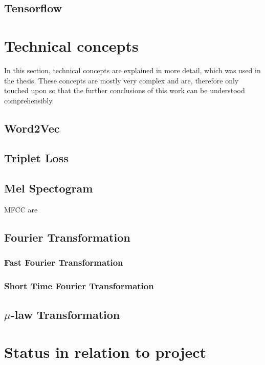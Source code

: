 \subsection{Tensorflow}
\label{sub:Tensorflow}

\section{Technical concepts}
\label{sec:Technical-Concepts}

In this section, technical concepts are explained in more detail, which was used in the thesis. These concepts are mostly very complex and are, therefore only touched upon so that the further conclusions of this work can be understood comprehensibly.

\subsection{Word2Vec}
\label{sub:word2wec}

\subsection{Triplet Loss}
\label{sub:Triplet-Loss}

\subsection{Mel Spectogram}
\label{sub:Mel-Spectogram}

\gls{MFCC} are

\subsection{Fourier Transformation}
\label{sub:Fourier-Transformation}

\subsubsection{Fast Fourier Transformation}
\label{subsub:Fast-Fourier-Transformation}

\subsubsection{Short Time Fourier Transformation}
\label{subsub:Short-Time-Fourier-Transformation}

\subsection{$\mu$-law Transformation}
\label{sub:Mu-Law-Transformation}

\section{Status in relation to project}
\label{sec:Status-Relation-Project}
